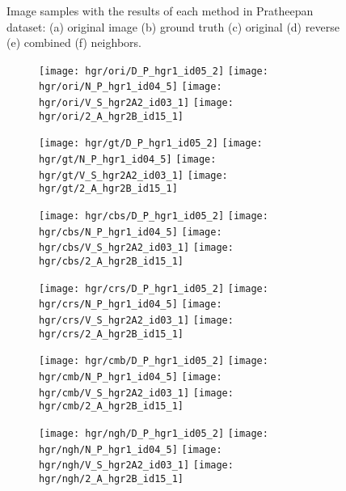 \begin{figure*}[!htb]
    \caption[Image samples with the results of each method in Pratheepan dataset]{Image samples with the results of each method in Pratheepan dataset: (a) original image (b) ground truth (c) original \cite{brancati:17} (d) reverse (e) combined (f) neighbors.}
    \label{fig:results_pratheepan}
\end{figure*}

\begin{figure*}[!htb]
    \centering
    \begin{subfigure}[t]{0.15\textwidth}
        \texttt{[image: hgr/ori/D\_P\_hgr1\_id05\_2]}
        \texttt{[image: hgr/ori/N\_P\_hgr1\_id04\_5]}
        \texttt{[image: hgr/ori/V\_S\_hgr2A2\_id03\_1]}
        \texttt{[image: hgr/ori/2\_A\_hgr2B\_id15\_1]}
        \caption{}
    \end{subfigure}
    \begin{subfigure}[t]{0.15\textwidth}
        \texttt{[image: hgr/gt/D\_P\_hgr1\_id05\_2]}
        \texttt{[image: hgr/gt/N\_P\_hgr1\_id04\_5]}
        \texttt{[image: hgr/gt/V\_S\_hgr2A2\_id03\_1]}
        \texttt{[image: hgr/gt/2\_A\_hgr2B\_id15\_1]}
        \caption{}
    \end{subfigure}
    \begin{subfigure}[t]{0.15\textwidth}
        \texttt{[image: hgr/cbs/D\_P\_hgr1\_id05\_2]}
        \texttt{[image: hgr/cbs/N\_P\_hgr1\_id04\_5]}
        \texttt{[image: hgr/cbs/V\_S\_hgr2A2\_id03\_1]}
        \texttt{[image: hgr/cbs/2\_A\_hgr2B\_id15\_1]}
        \caption{}
    \end{subfigure}
    \begin{subfigure}[t]{0.15\textwidth}
        \texttt{[image: hgr/crs/D\_P\_hgr1\_id05\_2]}
        \texttt{[image: hgr/crs/N\_P\_hgr1\_id04\_5]}
        \texttt{[image: hgr/crs/V\_S\_hgr2A2\_id03\_1]}
        \texttt{[image: hgr/crs/2\_A\_hgr2B\_id15\_1]}
        \caption{}
    \end{subfigure}
    \begin{subfigure}[t]{0.15\textwidth}
        \texttt{[image: hgr/cmb/D\_P\_hgr1\_id05\_2]}
        \texttt{[image: hgr/cmb/N\_P\_hgr1\_id04\_5]}
        \texttt{[image: hgr/cmb/V\_S\_hgr2A2\_id03\_1]}
        \texttt{[image: hgr/cmb/2\_A\_hgr2B\_id15\_1]}
        \caption{}
    \end{subfigure}
    \begin{subfigure}[t]{0.15\textwidth}
        \texttt{[image: hgr/ngh/D\_P\_hgr1\_id05\_2]}
        \texttt{[image: hgr/ngh/N\_P\_hgr1\_id04\_5]}
        \texttt{[image: hgr/ngh/V\_S\_hgr2A2\_id03\_1]}
        \texttt{[image: hgr/ngh/2\_A\_hgr2B\_id15\_1]}
        \caption{}
    \end{subfigure}


\end{figure*}
